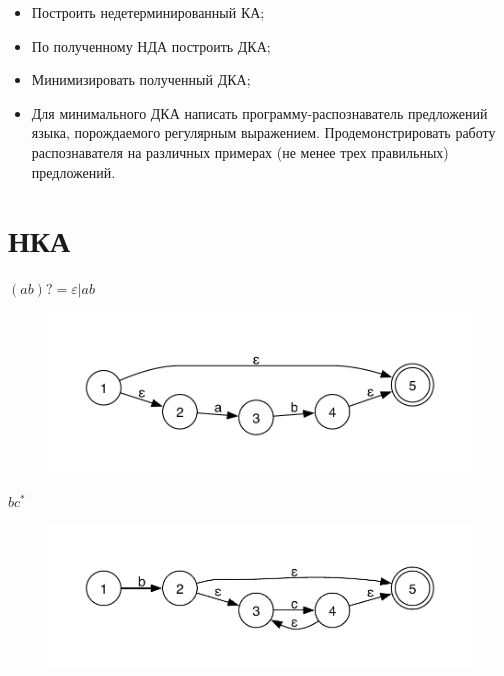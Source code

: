 \documentclass[12pt,onecolumn]{article}
\begin{document}
\noindent{}
\begin{itemize}
    \item Построить недетерминированный КА;
    \item По полученному НДА построить ДКА;
    \item Минимизировать полученный ДКА;
    \item Для минимального ДКА написать программу-распознаватель
    предложений языка, порождаемого регулярным выражением. Продемонстрировать работу распознавателя на различных примерах (не менее
    трех правильных) предложений.
\end{itemize}
\section*{НКА}
$(ab)? = \varepsilon | ab$

\begin{figure}[htp]
    \centering
    \includegraphics[width=\textwidth]{ab.pdf}
\end{figure}

$bc^*$
\begin{figure}[htp]
    \centering
    \includegraphics[width=\textwidth]{bc.pdf}
\end{figure}
\end{document}
